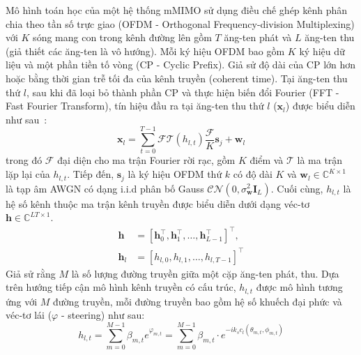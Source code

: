 Mô hình toán học của một hệ thống mMIMO sử dụng điều chế ghép kênh phân chia theo tần số trực giao (OFDM - Orthogonal Frequency-division Multiplexing) với $K$ sóng mang con trong kênh đường lên gồm $T$ ăng-ten phát và $L$ ăng-ten thu (giả thiết các ăng-ten là vô hướng). Mỗi ký hiệu OFDM bao gồm $K$ ký hiệu dữ liệu và một phần tiền tố vòng (CP - Cyclic Prefix). Giả sử độ dài của CP lớn hơn hoặc bằng thời gian trễ tối đa của kênh truyền (coherent time). Tại ăng-ten thu thứ $l$, sau khi đã loại bỏ thành phần CP và thực hiện biến đổi Fourier (FFT - Fast Fourier Transform), tín hiệu đầu ra tại ăng-ten thu thứ $l$ ($\mathbf{x}_l$) được biểu diễn như sau~\cite{Ladaycia2017}:
\begin{equation}
    \mathbf{x}_{l}=\sum_{t=0}^{T-1} \mathcal{F} \mathcal{T}\left(h_{l, t}\right) \frac{\mathcal{F}}{K} \mathbf{s}_{j}+\mathbf{w}_{l}
\end{equation}
trong đó $\mathcal{F}$ đại diện cho ma trận Fourier rời rạc, gồm $K$ điểm và $\mathcal{T}$ là ma trận lặp lại của $h_{l, t}$. Tiếp đến, $\mathbf{s}_{j}$ là ký hiệu OFDM thứ $k$ có độ dài $K$ và $\mathbf{w}_{l} \in \mathbb{C}^{K \times 1}$ là tạp âm AWGN có dạng i.i.d phân bố Gauss $\mathcal{C} \mathcal{N}\left({0}, \sigma_{\mathbf{w}}^{2} \mathbf{I}_L\right)$. 
Cuối cùng, $h_{l, t}$ là hệ số kênh thuộc ma trận kênh truyền được biểu diễn dưới dạng véc-tơ $\mathbf{h} \in \mathbb{C}^{L T \times 1}$.
\begin{equation}
    \label{eq:1}
    \begin{aligned} 
        \mathbf{h} &=\left[\mathbf{h}_{0}^{\top}, \mathbf{h}_{1}^{\top}, \ldots, \mathbf{h}_{L - 1 }^{\top}\right]^{\top}, \\ \mathbf{h}_{l} &=\left[h_{l, 0}, h_{l, 1}, \ldots, h_{l, T - 1 }\right]^{\top}
    \end{aligned}
\end{equation}
Giả sử rằng $M$ là số lượng đường truyền giữa một cặp ăng-ten phát, thu. Dựa trên hướng tiếp cận mô hình kênh truyền có cấu trúc, $h_{l, t}$ được mô hình tương ứng với $M$ đường truyền, mỗi đường truyền bao gồm hệ số khuếch đại phức và véc-tơ lái ($\varphi$ - steering) như sau:
\begin{equation}
\label{eq:2}
        h_{l, t} = \sum\limits_{m=0}^{M-1} \beta_{m, t} e^{\varphi_{m, t}} = \sum\limits_{m=0}^{M-1} \beta_{m, t} \cdot e^{-i k_s c_l(\theta_{m, t}, \phi_{m, t})} 
\end{equation}
